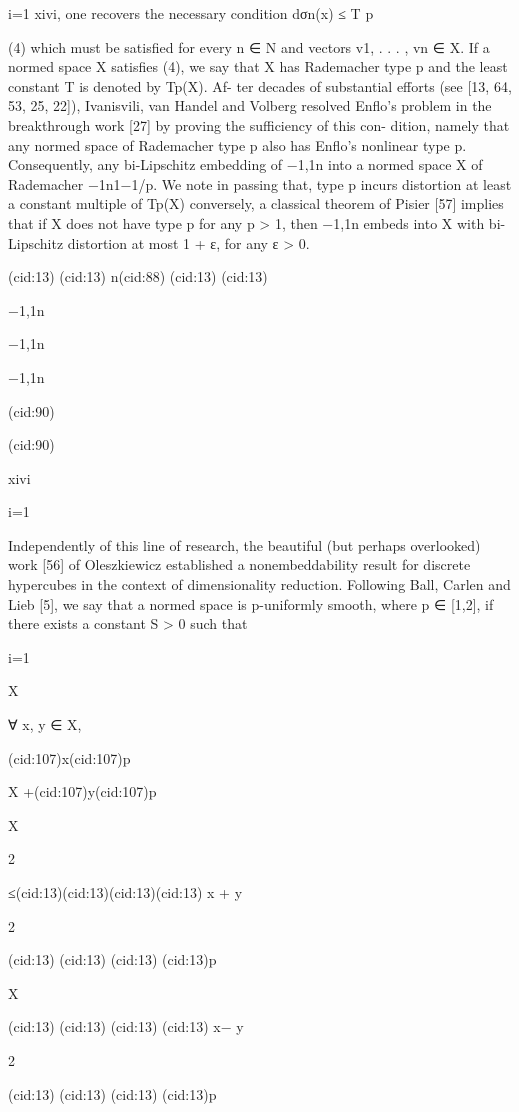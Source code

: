 i=1 xivi, one recovers the necessary condition
dσn(x) ≤ T p

(4)
which must be satisﬁed for every n ∈ N and vectors v1, . . . , vn ∈ X. If a normed space X satisﬁes
(4), we say that X has Rademacher type p and the least constant T is denoted by Tp(X). Af-
ter decades of substantial eﬀorts (see [13, 64, 53, 25, 22]), Ivanisvili, van Handel and Volberg
resolved Enﬂo’s problem in the breakthrough work [27] by proving the suﬃciency of this con-
dition, namely that any normed space of Rademacher type p also has Enﬂo’s nonlinear type p.
Consequently, any bi-Lipschitz embedding of {−1,1}n into a normed space X of Rademacher
−1n1−1/p. We note in passing that,
type p incurs distortion at least a constant multiple of Tp(X)
conversely, a classical theorem of Pisier [57] implies that if X does not have type p for any
p > 1, then {−1,1}n embeds into X with bi-Lipschitz distortion at most 1 + ε, for any ε > 0.

(cid:13)
(cid:13) n(cid:88)
(cid:13)
(cid:13)

{−1,1}n

{−1,1}n

{−1,1}n

(cid:90)

(cid:90)

xivi

i=1

Independently of this line of research, the beautiful (but perhaps overlooked) work [56] of
Oleszkiewicz established a nonembeddability result for discrete hypercubes in the context of
dimensionality reduction. Following Ball, Carlen and Lieb [5], we say that a normed space is
p-uniformly smooth, where p ∈ [1,2], if there exists a constant S > 0 such that

i=1

X

∀ x, y ∈ X,

(cid:107)x(cid:107)p

X +(cid:107)y(cid:107)p

X

2

≤(cid:13)(cid:13)(cid:13)(cid:13) x + y

2

(cid:13)
(cid:13)
(cid:13)
(cid:13)p

X

(cid:13)
(cid:13)
(cid:13)
(cid:13) x− y

2

(cid:13)
(cid:13)
(cid:13)
(cid:13)p

